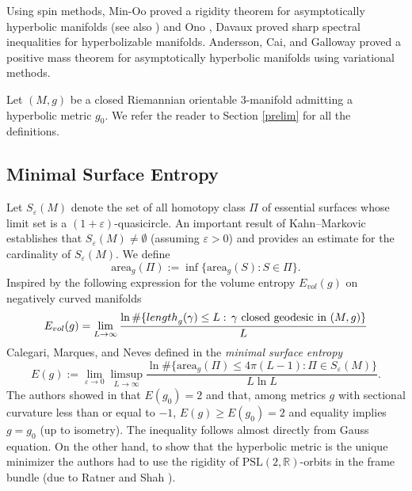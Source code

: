 \documentclass[11pt]{amsart}
\def\R{\mathbb R}
\theoremstyle{remark}
\theoremstyle{definition}
\begin{document}
	
	Using spin methods,  Min-Oo \cite{min-oo} proved a rigidity theorem for asymptotically hyperbolic  manifolds (see also \cite{CH,Wang}) and Ono \cite{ono},  Davaux \cite{davaux} proved sharp spectral inequalities for hyperbolizable manifolds.  Andersson, Cai, and Galloway \cite{andersson-cai-galloway} proved a  positive mass theorem for asymptotically hyperbolic  manifolds using variational methods.
	
	Let $(M,g)$ be a closed Riemannian orientable $3$-manifold admitting a hyperbolic metric $g_0$.  We refer the reader to   Section \ref{prelim} for all the definitions.
	
	\subsection{Minimal Surface Entropy}  
	Let $S_{\varepsilon}(M)$ denote the set of all homotopy class $\Pi$ of essential surfaces whose limit set is a $(1+\varepsilon)$-quasicircle. An important result of  Kahn--Markovic \cite{kahn-markovic2, kahn-markovic} establishes that $S_{\varepsilon}(M)\neq\emptyset$  (assuming $\varepsilon>0$) and provides an estimate for the cardinality of $S_{\varepsilon}(M)$. We define
	$$\text{area}_{g}(\Pi):=\inf \{\text{area}_{g}(S): S\in \Pi\}.$$
	Inspired by  the following expression for the volume entropy $E_{vol}(g)$ on negatively curved manifolds
	\begin{equation*}
		E_{vol}(g)=\lim_{L\to\infty}\frac{\ln\#\{{\rm length}_g(\gamma)\leq L:\,\gamma\text{ closed geodesic in }(M,g)\}}{L}
	\end{equation*}
	Calegari, Marques, and Neves defined in \cite{cal-marques-neves} the {\em minimal surface entropy}%
	$$
		E(g):=\lim_{\varepsilon\to 0}\limsup_{L\to\infty}\frac{\ln \#\{\text{area}_g(\Pi)\leq 4\pi(L-1):\Pi\in S_{\varepsilon}(M)\}}{L\ln L}.
	$$
	The authors showed in \cite{cal-marques-neves} that $E(g_0)=2$ and that, among metrics $g$ with sectional curvature less than or equal to $-1$, $E(g)\geq E(g_0)=2$ and equality implies $g=g_0$ (up to isometry). The inequality follows almost directly from Gauss equation. On the other hand, to show that the hyperbolic metric is the unique minimizer the authors had to use  the rigidity of $\text {PSL}(2,\R)$-orbits in the frame bundle (due to Ratner  \cite{ratner} and Shah \cite{shah}).
	
\end{document}
